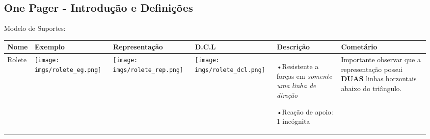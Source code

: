 \documentclass{article}
\begin{document}
        \subsection{One Pager - Introdução e Definições}
                Modelo de Suportes:
                \begin{table}[h]\tiny
                    \begin{tabularx}{\textwidth}{|l|X|X|X|l|l|}\hline
                        \textbf{Nome} & \textbf{Exemplo} & \textbf{Representação} & \textbf{D.C.L} & \textbf{Descrição} & \textbf{Cometário} \\ \hline
    
                        Rolete & 
    
                            \begin{minipage}{.2\textwidth}
                                \centering
                                \texttt{[image: imgs/rolete\_eg.png]}
                            \end{minipage} &
    
                            \begin{minipage}{.2\columnwidth}
                                \centering
                                \texttt{[image: imgs/rolete\_rep.png]}
                            \end{minipage} &
    
                            \begin{minipage}{.2\columnwidth}
                                \centering
                                \texttt{[image: imgs/rolete\_dcl.png]}
                            \end{minipage} &
    
                            \begin{minipage}{.1\columnwidth}
                                \tiny
                                •Resistente a forças em \emph{somente uma linha de direção}
    
                                    •Reação de apoio: 1 incógnita
                            \end{minipage}&
    
                            \begin{minipage}{.1\columnwidth}
                                \vspace{5px}
                                \tiny
                                Importante observar que a representação possui \textbf{DUAS} linhas horzontais abaixo do triângulo.
                                \vspace{5px}
                            \end{minipage} \\ \hline
    

\end{tabularx}
\end{table}
\end{document}
